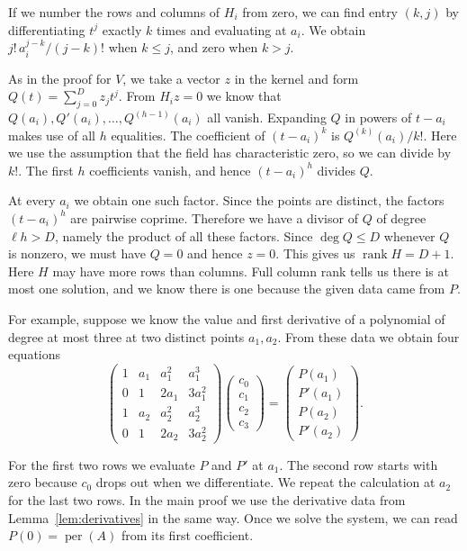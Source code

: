 \documentclass{article}
\theoremstyle{definition}
\DeclareMathOperator{\per}{per}
\DeclareMathOperator{\rank}{rank}
\begin{document}
If we number the rows and columns of \(H_i\) from zero, we can find
entry \((k,j)\) by differentiating \(t^j\) exactly \(k\) times and
evaluating at \(a_i\). We obtain \(j!\,a_i^{j-k}/(j-k)!\) when
\(k\le j\), and zero when \(k>j\).

As in the proof for \(V\), we take a vector \(z\) in the kernel and
form \(Q(t)=\sum_{j=0}^D z_jt^j\). From \(H_i z=0\) we know that
\(Q(a_i),Q'(a_i),\ldots,Q^{(h-1)}(a_i)\) all vanish. Expanding
\(Q\) in powers of \(t-a_i\) makes use of all \(h\) equalities. The
coefficient of \((t-a_i)^k\) is \(Q^{(k)}(a_i)/k!\). Here we use
the assumption that the field has characteristic zero, so we can
divide by \(k!\). The first \(h\) coefficients vanish, and hence
\((t-a_i)^h\) divides \(Q\).

At every \(a_i\) we obtain one such factor. Since the points are
distinct, the factors \((t-a_i)^h\) are pairwise coprime.
Therefore we have a divisor of \(Q\) of degree \(\ell h>D\), namely
the product of all these factors. Since \(\deg Q\le D\) whenever \(Q\)
is nonzero, we must have \(Q=0\) and hence \(z=0\). This gives us
\(\rank H=D+1\).
Here \(H\) may have more rows than columns. Full column rank tells us
there is at most one solution, and we know there is one because the
given data came from \(P\).

For example, suppose we know the value and first derivative of a
polynomial of degree at most three at two distinct points \(a_1,a_2\).
From these data we obtain four equations
\[
    \begin{pmatrix}
        1 & a_1 & a_1^2 & a_1^3\\
        0 & 1   & 2a_1  & 3a_1^2\\
        1 & a_2 & a_2^2 & a_2^3\\
        0 & 1   & 2a_2  & 3a_2^2
    \end{pmatrix}
    \begin{pmatrix}c_0\\c_1\\c_2\\c_3\end{pmatrix}
    =
    \begin{pmatrix}P(a_1)\\P'(a_1)\\P(a_2)\\P'(a_2)\end{pmatrix}.
\]

For the first two rows we evaluate \(P\) and \(P'\) at \(a_1\).
The second row starts with zero because \(c_0\) drops out when we
differentiate. We repeat the calculation at \(a_2\) for the last two
rows. In the main proof we use the derivative data from
Lemma~\ref{lem:derivatives} in the same way. Once we solve the system,
we can read \(P(0)=\per(A)\) from its first coefficient.
\end{document}
